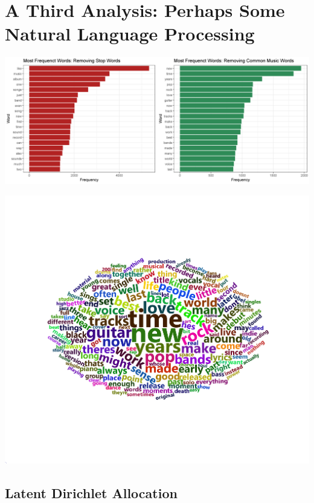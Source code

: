 \documentclass[a4paper,12pt]{article}
\begin{document}
\section{A Third Analysis: Perhaps Some Natural Language Processing}
\includegraphics[width = \linewidth]{"figures/word_distribution_plot.png"}

\includegraphics[width = \linewidth]{"figures/wordcloud.png"}

\subsection{Latent Dirichlet Allocation}
\end{document}

